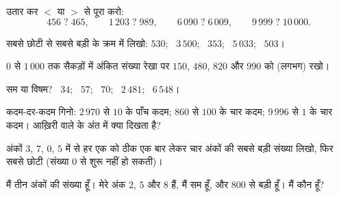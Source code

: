 \begin{exercise}[$\star$]\label{exo:g3:numbers:5}
उतार कर $<$ या $>$ से पूरा करो:
\[
456 \;?\; 465, \qquad
1\,203 \;?\; 989, \qquad
6\,090 \;?\; 6\,009, \qquad
9\,999 \;?\; 10\,000 .
\]
\end{exercise}

\begin{exercise}[$\star$]\label{exo:g3:numbers:6}
सबसे छोटी से सबसे बड़ी के क्रम में लिखो: $530$; \ $3\,500$; \ $353$; \ $5\,033$;
\ $503$।
\end{exercise}

\begin{exercise}[$\star$]\label{exo:g3:numbers:7}
$0$ से $1\,000$ तक सैकड़ों में अंकित संख्या रेखा पर $150$, $480$,
$820$ और $990$ को (लगभग) रखो।
\end{exercise}

\begin{exercise}[$\star$]\label{exo:g3:numbers:8}
सम या विषम? \ $34$; \ $57$; \ $70$; \ $2\,481$; \ $6\,548$।
\end{exercise}

\begin{exercise}[$\star$]\label{exo:g3:numbers:9}
कदम-दर-कदम गिनो: $2\,970$ से $10$ के पाँच कदम; $860$ से
$100$ के चार कदम; $9\,996$ से $1$ के चार कदम।
आख़िरी वाले के अंत में क्या दिखता है?
\end{exercise}

\begin{exercise}[$\star\star$]\label{exo:g3:numbers:10}
अंकों $3$, $7$, $0$, $5$ में से हर एक को ठीक एक बार लेकर चार
अंकों की सबसे बड़ी संख्या लिखो, फिर सबसे छोटी (संख्या $0$ से
शुरू नहीं हो सकती)।
\end{exercise}

\begin{exercise}[$\star\star$]\label{exo:g3:numbers:11}
मैं तीन अंकों की संख्या हूँ। मेरे अंक $2$, $5$ और $8$ हैं, मैं सम हूँ,
और $800$ से बड़ी हूँ। मैं कौन हूँ?
\end{exercise}
